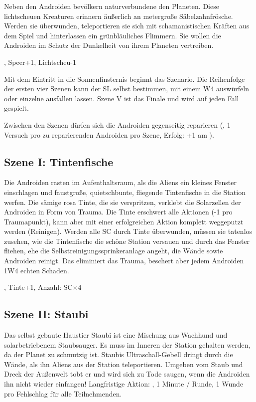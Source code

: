 {		Neben den Androiden bevölkern naturverbundene  den Planeten. Diese lichtscheuen Kreaturen erinnern äußerlich an metergroße Säbelzahnfrösche. Werden sie überwunden, teleportieren sie sich mit schamanistischen Kräften aus dem Spiel und hinterlassen ein grünbläuliches Flimmern. Sie wollen die Androiden im Schutz der Dunkelheit von ihrem Planeten vertreiben.

		, Speer+1, Lichtscheu-1


		\noindent
		Mit dem Eintritt in die Sonnenfinsternis beginnt das Szenario. Die Reihenfolge der ersten vier Szenen kann der SL selbst bestimmen, mit einem W4 auswürfeln oder einzelne ausfallen lassen. Szene V ist das Finale und wird auf jeden Fall gespielt.

		Zwischen den Szenen dürfen sich die Androiden gegenseitig reparieren (, 1 Versuch pro zu reparierenden Androiden pro Szene, Erfolg: +1 am \HD).

		\subsection{Szene I: Tintenfische}

		\noindent
		Die Androiden rasten im Aufenthaltsraum, als die Aliens ein kleines Fenster einschlagen und faustgroße, quietschbunte, fliegende Tintenfische in die Station werfen. Die sämige rosa Tinte, die sie verspritzen, verklebt die Solarzellen der Androiden in Form von Trauma. Die Tinte erschwert alle Aktionen (-1 pro Traumapunkt), kann aber mit einer erfolgreichen Aktion komplett weggeputzt werden (Reinigen). Werden alle SC durch Tinte überwunden, müssen sie tatenlos zusehen, wie die Tintenfische die schöne Station versauen und durch das Fenster fliehen, ehe die Selbstreinigungssprinkeranlage angeht, die Wände sowie Androiden reinigt. Das eliminiert das Trauma, beschert aber jedem Androiden 1W4 echten Schaden.

		, Tinte+1, Anzahl: SC×4

		\subsection{Szene II: Staubi}

		\noindent
		Das selbst gebaute Haustier Staubi ist eine Mischung aus Wachhund und solarbetriebenem Staubsauger. Es muss im Inneren der Station gehalten werden, da der Planet zu schmutzig ist. Staubis Ultraschall-Gebell dringt durch die Wände, als ihn Aliens aus der Station teleportieren. Umgeben vom Staub und Dreck der Außenwelt tobt er und wird sich zu Tode saugen, wenn die Androiden ihn nicht wieder einfangen! Langfristige Aktion: , 1 Minute / Runde, 1 Wunde pro Fehlschlag für alle Teilnehmenden.

}
